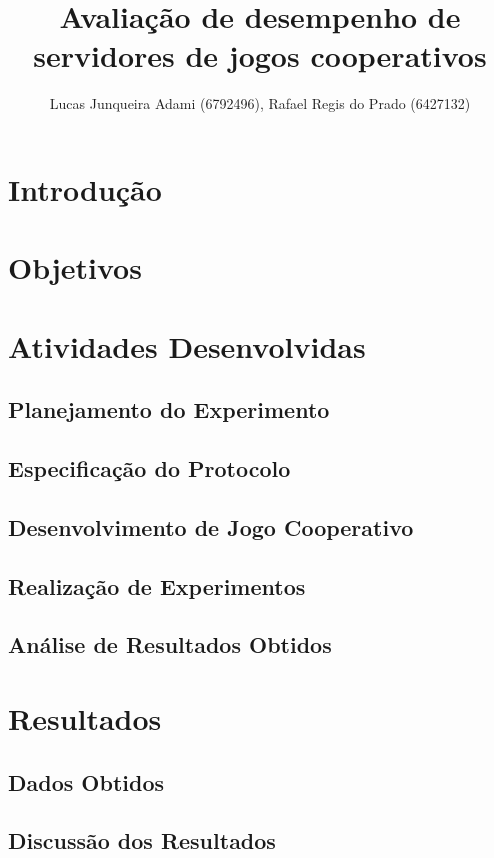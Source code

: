 \documentclass[12pt]{article}
\title{Avaliação de desempenho de servidores de jogos cooperativos}
\author{Lucas Junqueira Adami (6792496)\inst{1}, Rafael Regis do Prado (6427132)\inst{1}}
\begin{document}
 

\maketitle

\begin{resumo} %
\end{resumo}

\section{Introdução} \label{sec:introcao}
\section{Objetivos} \label{sec:objetivos}
\section{Atividades Desenvolvidas} \label{sec:atividades}
\subsection{Planejamento do Experimento} \label{sub:planejamento}
\subsection{Especificação do Protocolo} \label{sub:protocolo}
\subsection{Desenvolvimento de Jogo Cooperativo} \label{sub:desenvolvimento}
\subsection{Realização de Experimentos} \label{sub:realização}
\subsection{Análise de Resultados Obtidos} \label{sub:analise}
\section{Resultados} \label{sec:resultados}
\subsection{Dados Obtidos} \label{sub:dados}
\subsection{Discussão dos Resultados} \label{sub:discussao}
\end{document}

